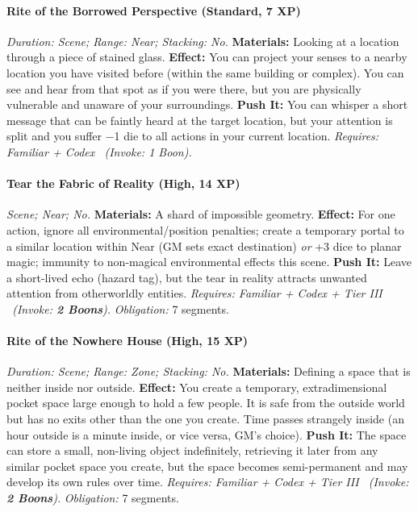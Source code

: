 \paragraph{Rite of the Borrowed Perspective (Standard, 7 XP)} \emph{Duration: Scene; Range: Near; Stacking: No.}
\textbf{Materials:} Looking at a location through a piece of stained glass.
\textbf{Effect:} You can project your senses to a nearby location you have visited before (within the same building or complex). You can see and hear from that spot as if you were there, but you are physically vulnerable and unaware of your surroundings.
\textbf{Push It:} You can whisper a short message that can be faintly heard at the target location, but your attention is split and you suffer −1 die to all actions in your current location.
\emph{Requires: Familiar + Codex \ (\textit{Invoke:} 1 Boon).}
\paragraph{Tear the Fabric of Reality (High, 14 XP)} \emph{Scene; Near; No.}
\textbf{Materials:} A shard of impossible geometry.
\textbf{Effect:} For one action, ignore all environmental/position penalties; create a temporary portal to a similar location within Near (GM sets exact destination) \emph{or} +3 dice to planar magic; immunity to non-magical environmental effects this scene.
\textbf{Push It:} Leave a short-lived echo (hazard tag), but the tear in reality attracts unwanted attention from otherworldly entities.
\emph{Requires: Familiar + Codex + Tier III \ (\textit{Invoke:} \textbf{2 Boons}).}
\emph{Obligation:} 7 segments.

\paragraph{Rite of the Nowhere House (High, 15 XP)} \emph{Duration: Scene; Range: Zone; Stacking: No.}
\textbf{Materials:} Defining a space that is neither inside nor outside.
\textbf{Effect:} You create a temporary, extradimensional pocket space large enough to hold a few people. It is safe from the outside world but has no exits other than the one you create. Time passes strangely inside (an hour outside is a minute inside, or vice versa, GM's choice).
\textbf{Push It:} The space can store a small, non-living object indefinitely, retrieving it later from any similar pocket space you create, but the space becomes semi-permanent and may develop its own rules over time.
\emph{Requires: Familiar + Codex + Tier III \ (\textit{Invoke:} \textbf{2 Boons}).}
\emph{Obligation:} 7 segments.

